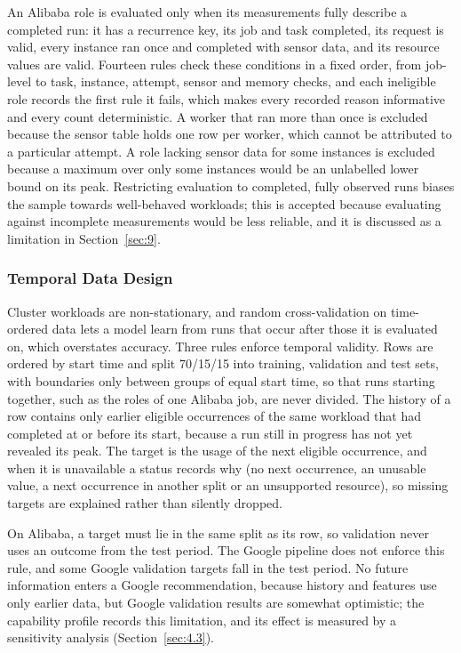 \documentclass{IEEEtran}
\begin{document}
An Alibaba role is evaluated only when its measurements fully describe a completed run: it has a recurrence key, its job and task completed, its request is valid, every instance ran once and completed with sensor data, and its resource values are valid. Fourteen rules check these conditions in a fixed order, from job-level to task, instance, attempt, sensor and memory checks, and each ineligible role records the first rule it fails, which makes every recorded reason informative and every count deterministic. A worker that ran more than once is excluded because the sensor table holds one row per worker, which cannot be attributed to a particular attempt. A role lacking sensor data for some instances is excluded because a maximum over only some instances would be an unlabelled lower bound on its peak. Restricting evaluation to completed, fully observed runs biases the sample towards well-behaved workloads; this is accepted because evaluating against incomplete measurements would be less reliable, and it is discussed as a limitation in Section~\ref{sec:9}.

\subsubsection{Temporal Data Design}\label{sec:4.1.7}

Cluster workloads are non-stationary, and random cross-validation on time-ordered data lets a model learn from runs that occur after those it is evaluated on, which overstates accuracy. Three rules enforce temporal validity. Rows are ordered by start time and split 70/15/15 into training, validation and test sets, with boundaries only between groups of equal start time, so that runs starting together, such as the roles of one Alibaba job, are never divided. The history of a row contains only earlier eligible occurrences of the same workload that had completed at or before its start, because a run still in progress has not yet revealed its peak. The target is the usage of the next eligible occurrence, and when it is unavailable a status records why (no next occurrence, an unusable value, a next occurrence in another split or an unsupported resource), so missing targets are explained rather than silently dropped.

On Alibaba, a target must lie in the same split as its row, so validation never uses an outcome from the test period. The Google pipeline does not enforce this rule, and some Google validation targets fall in the test period. No future information enters a Google recommendation, because history and features use only earlier data, but Google validation results are somewhat optimistic; the capability profile records this limitation, and its effect is measured by a sensitivity analysis (Section~\ref{sec:4.3}).
\end{document}
